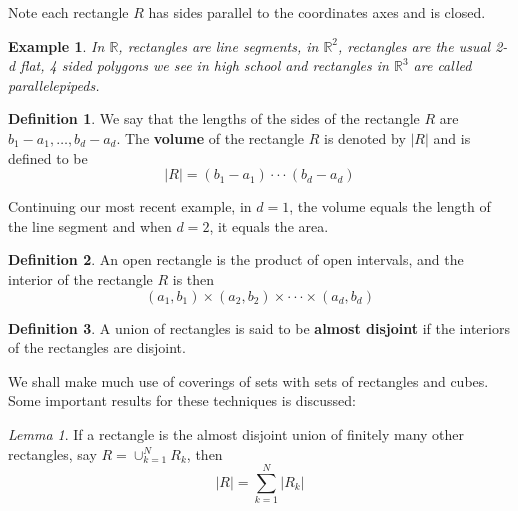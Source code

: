 \documentclass[a4paper, 11pt]{book}
\newtheorem*{example}{Example}
\theoremstyle{definition}
\newtheorem{definition}{Definition}[section]
\theoremstyle{remark}
\newtheorem{lemma}[theorem]{Lemma}
\begin{document}
    Note each rectangle $R$ has sides parallel to the coordinates axes and is closed.

    \begin{example}
        In $\mathbb{R}$, rectangles are line segments, in $\mathbb{R}^2$, rectangles are the usual 2-d flat, 4 sided polygons we
        see in high school and rectangles in $\mathbb{R}^3$ are called parallelepipeds.
    \end{example}

    \begin{definition}
        We say that the lengths of the sides of the rectangle $R$ are $b_1-a_1,\hdots,b_d-a_d$. The \textbf{volume} of the rectangle
        $R$ is denoted by $|R|$ and is defined to be
        \[ |R| = (b_1-a_1)\cdot\cdot\cdot(b_d-a_d) \]
    \end{definition}

    Continuing our most recent example, in $d=1$, the volume equals the length of the line segment and when $d=2$, it equals the area.

    \begin{definition}
        An open rectangle is the product of open intervals, and the interior of the rectangle $R$ is then
        \[ (a_1,b_1)\times(a_2,b_2)\times\cdot\cdot\cdot\times(a_d,b_d) \]
    \end{definition}

    \begin{definition}
        A union of rectangles is said to be \textbf{almost disjoint} if the interiors of the rectangles are disjoint.
    \end{definition}

    We shall make much use of coverings of sets with sets of rectangles and cubes. Some important results for these techniques
    is discussed:

    \begin{lemma}
        If a rectangle is the almost disjoint union of finitely many other rectangles, say $R = \cup_{k=1}^N R_k$, then
        \[ |R| = \sum_{k=1}^N |R_k| \]
    \end{lemma}
\end{document}

